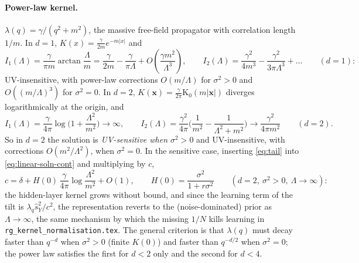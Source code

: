 \documentclass[11pt,a4paper]{article}
\newcommand{\Lam}{\Lambda}
\newcommand{\sY}{\hat s_Y}
\begin{document}
\paragraph{Power-law kernel.}
$\lambda(q) = \gamma/(q^2+m^2)$, the massive free-field propagator with correlation length $1/m$. In $d=1$, $K(x) = \frac{\gamma}{2m}e^{-m|x|}$ and
\begin{equation}
  I_1(\Lam) = \frac{\gamma}{\pi m}\arctan\frac{\Lam}{m} = \frac{\gamma}{2m} - \frac{\gamma}{\pi\Lam} + O\!\left(\frac{\gamma m^2}{\Lam^3}\right),
  \qquad
  I_2(\Lam) = \frac{\gamma^2}{4m^3} - \frac{\gamma^2}{3\pi\Lam^3} + \dots\qquad(d=1):
\end{equation}
UV-insensitive, with power-law corrections $O(m/\Lam)$ for $\sigma^2>0$ and $O((m/\Lam)^3)$ for $\sigma^2 = 0$. In $d=2$, $K(\mathbf x) = \frac{\gamma}{2\pi}\mathrm K_0(m|\mathbf x|)$ diverges logarithmically at the origin, and
\begin{equation}
  I_1(\Lam) = \frac{\gamma}{4\pi}\log\Big(1+\frac{\Lam^2}{m^2}\Big)\to\infty,
  \qquad
  I_2(\Lam) = \frac{\gamma^2}{4\pi}\Big(\frac1{m^2}-\frac1{\Lam^2+m^2}\Big)\to\frac{\gamma^2}{4\pi m^2}\qquad(d=2).
\end{equation}
So in $d=2$ the solution is \emph{UV-sensitive when $\sigma^2>0$} and UV-insensitive, with corrections $O(m^2/\Lam^2)$, when $\sigma^2 = 0$. In the sensitive case, inserting \eqref{eq:tail} into \eqref{eq:linear-soln-cont} and multiplying by $c$,
\begin{equation}
  c = \delta + H(0)\,\frac{\gamma}{4\pi}\log\frac{\Lam^2}{m^2} + O(1),
  \qquad H(0) = \frac{\sigma^2}{1+r\sigma^2}
  \qquad(d=2,\ \sigma^2>0,\ \Lam\to\infty):
  \label{eq:c-log}
\end{equation}
the hidden-layer kernel grows without bound, and since the learning term of the tilt is $\lambda_q\sY^2/c^2$, the representation reverts to the (noise-dominated) prior as $\Lam\to\infty$, the same mechanism by which the missing $1/N$ kills learning in \texttt{rg\_kernel\_normalisation.tex}. The general criterion is that $\lambda(q)$ must decay faster than $q^{-d}$ when $\sigma^2>0$ (finite $K(0)$) and faster than $q^{-d/2}$ when $\sigma^2 = 0$; the power law satisfies the first for $d<2$ only and the second for $d<4$.
\end{document}
